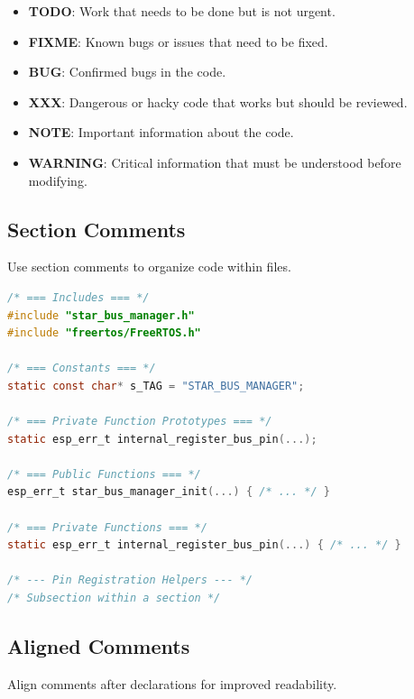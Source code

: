 \begin{itemize}
    \item \textbf{TODO}: Work that needs to be done but is not urgent.
    \item \textbf{FIXME}: Known bugs or issues that need to be fixed.
    \item \textbf{BUG}: Confirmed bugs in the code.
    \item \textbf{XXX}: Dangerous or hacky code that works but should be reviewed.
    \item \textbf{NOTE}: Important information about the code.
    \item \textbf{WARNING}: Critical information that must be understood before modifying.
\end{itemize}

\subsection{Section Comments}

Use section comments to organize code within files.

\begin{lstlisting}[language=C]
/* === Includes === */
#include "star_bus_manager.h"
#include "freertos/FreeRTOS.h"

/* === Constants === */
static const char* s_TAG = "STAR_BUS_MANAGER";

/* === Private Function Prototypes === */
static esp_err_t internal_register_bus_pin(...);

/* === Public Functions === */
esp_err_t star_bus_manager_init(...) { /* ... */ }

/* === Private Functions === */
static esp_err_t internal_register_bus_pin(...) { /* ... */ }

/* --- Pin Registration Helpers --- */
/* Subsection within a section */
\end{lstlisting}

\subsection{Aligned Comments}

Align comments after declarations for improved readability.

